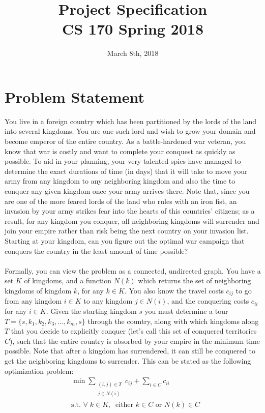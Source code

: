 \documentclass{article}
\title{
  Project Specification \\
  \large CS 170 Spring 2018 \\
}
\date{March 8th, 2018}
\begin{document}
\maketitle


\section*{Problem Statement}
You live in a foreign country which has been partitioned by the lords of the land into several kingdoms. You are one such lord and wish to grow your domain and become emperor of the entire country. As a battle-hardened war veteran, you know that war is costly and want to complete your conquest as quickly as possible. To aid in your planning, your very talented spies have managed to determine the exact durations of time (in days) that it will take to move your army from any kingdom to any neighboring kingdom and also the time to conquer any given kingdom once your army arrives there. Note that, since you are one of the more feared lords of the land who rules with an iron fist, an invasion by your army strikes fear into the hearts of this countries' citizens; as a result, for any kingdom you conquer, all neighboring kingdoms will surrender and join your empire rather than risk being the next country on your invasion list. Starting at your kingdom, can you figure out the optimal war campaign that conquers the country in the least amount of time possible?
\\ \\
Formally, you can view the problem as a connected, undirected graph. You have a set $K$ of kingdoms, and a function $N(k)$ which returns the set of neighboring kingdoms of kingdom $k$, for any $k \in K$. You also know the travel costs $c_{ij}$ to go from any kingdom $i \in K$ to any kingdom $j \in N(i)$, and the conquering costs $c_{ii}$ for any $i \in K$. Given the starting kingdom $s$ you must determine a tour $T = \{s, k_1, k_2, k_3, \ldots, k_m, s\}$ through the country, along with which kingdoms along $T$ that you decide to explicitly conquer (let's call this set of conquered territories $C$), such that the entire country is absorbed by your empire in the minimum time possible. Note that after a kingdom has surrendered, it can still be conquered to get the neighboring kingdoms to surrender. This can be stated as the following optimization problem:
\begin{align*}
&\min \sum_{\substack{(i, j) \in T \\ j \in N(i)}}c_{ij} + \sum_{i \in C}c_{ii}    \\
&\text{s.t. } \forall \; k \in K, \;\; \text{either } k \in C \text{ or } N(k) \in C   
\end{align*}
\end{document}
